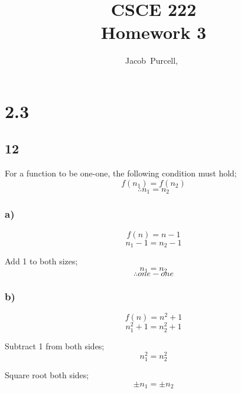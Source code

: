 \documentclass[journal]{IEEEtran}
\begin{document}
\title{CSCE 222 \\ Homework 3}

\author{Jacob~Purcell,~}

\maketitle
\section*{2.3}
\subsection*{12}
    For a function to be one-one, the following condition must hold;
    \begin{equation}
    f(n_1) = f(n_2)
    \end{equation}
    $$\therefore n_1 = n_2$$
    \subsubsection*{a)}
        \begin{equation}
            f(n) = n - 1
        \end{equation}
        \begin{equation}
            n_1 - 1 = n_2 - 1
        \end{equation}
        
        Add 1 to both sizes;
        \begin{equation}
            n_1 = n_2
        \end{equation}
        $$\boxed{\therefore one-one}$$

    \subsubsection*{b)}
        \begin{equation}
            f(n) = n^2 + 1
        \end{equation}
        \begin{equation}
            n_1^2 + 1 = n_2^2 + 1
        \end{equation}

        Subtract 1 from both sides;
        \begin{equation}
            n_1^2 = n_2^2
        \end{equation}

        Square root both sides;
        \begin{equation}
            \pm n_1 = \pm n_2
        \end{equation}
\end{document}
